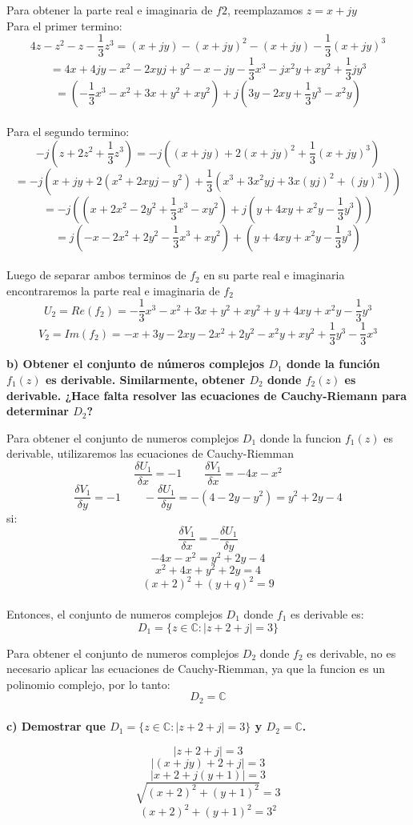 \documentclass[12pt]{report}
\begin{document}
Para obtener la parte real e imaginaria de $f2$, reemplazamos $z=x+jy$\\
Para el primer termino:
$$4z - z^2 - z - \frac{1}{3}z^3=(x+jy) - (x+jy)^2 - (x+jy) - \frac{1}{3}(x+jy)^3$$
$$=4x + 4jy -x^2 -2xyj + y^2 -x -jy - \frac{1}{3}x^3 - jx^2y + xy^2 + \frac{1}{3}jy^3$$
$$=(- \frac{1}{3}x^3 -x^2 + 3x + y^2 + xy^2) +j(3y -2xy + \frac{1}{3}y^3 - x^2y )$$ \\
Para el segundo termino:
$$-j (z + 2z^2 + \frac{1}{3}z^3) = -j ((x+jy) + 2(x+jy)^2 + \frac{1}{3}(x+jy)^3)$$
$$=-j (x+jy + 2(x^2+2xyj-y^2) + \frac{1}{3}(x^3 + 3x^2yj + 3x(yj)^2 + (jy)^3))$$
$$=-j ((x + 2x^2 - 2y^2 + \frac{1}{3} x^3 - xy^2) + j( y +4xy + x^2y - \frac{1}{3}y^3))$$
$$=j(-x - 2x^2 + 2y^2 - \frac{1}{3} x^3 + xy^2) + ( y +4xy + x^2y - \frac{1}{3}y^3)$$\\
Luego de separar ambos terminos de $f_2$ en su parte real e imaginaria encontraremos la parte real
e imaginaria de $f_2$
$$U_2=Re(f_2)=- \frac{1}{3}x^3 - x^2 + 3x + y^2 + xy^2 + y +4xy + x^2y - \frac{1}{3}y^3$$
$$V_2=Im(f_2)=-x + 3y -2xy - 2x^2 + 2y^2 - x^2y + xy^2 + \frac{1}{3}y^3 - \frac{1}{3} x^3$$

\textbf{b) Obtener el conjunto de números complejos $D_1$ donde la función $f_1(z)$ es derivable. Similarmente, obtener $D_2$ donde $f_2(z)$ es derivable.
¿Hace falta resolver las ecuaciones de Cauchy-Riemann para determinar $D_2$?}

Para obtener el conjunto de numeros complejos $D_1$ donde la funcion $f_1(z)$ es derivable, utilizaremos las ecuaciones de Cauchy-Riemman
$$\frac{\delta U_1}{\delta x}=-1 \quad \quad \frac{\delta V_1}{\delta x}=-4x-x^2$$
$$\frac{\delta V_1}{\delta y}=-1 \quad \quad - \frac{\delta U_1}{\delta y}=-(4-2y-y^2)=y^2+2y-4$$
si:$$\frac{\delta V_1}{\delta x}=-\frac{\delta U_1}{\delta y}$$
$$-4x-x^2=y^2+2y-4$$
$$x^2+4x+y^2+2y=4$$
$$(x+2)^2+(y+q)^2=9$$\\
Entonces, el conjunto de numeros complejos $D_1$ donde $f_1$ es derivable es:
$$D_1 = \{z \in \mathbb{C} : |z + 2 + j| = 3\}$$

Para obtener el conjunto de numeros complejos $D_2$ donde $f_2$ es derivable, no es necesario aplicar las ecuaciones de Cauchy-Riemman,
ya que la funcion es un polinomio complejo, por lo tanto:
$$D_2=\mathbb{C}$$\\

\textbf{c) Demostrar que $D_1 = \{z \in \mathbb{C} : |z + 2 + j| = 3\}$ y $D_2 = \mathbb{C}$.}

$$|z+2+j|=3$$
$$|(x+jy)+2+j|=3$$
$$|x+2+j(y+1)|=3$$
$$\sqrt{(x+2)^2+(y+1)^2}=3$$
$$(x+2)^2+(y+1)^2=3^2$$\\
\end{document}
